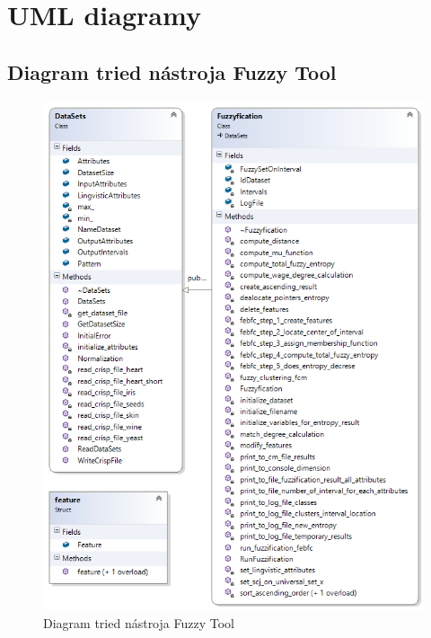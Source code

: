\chapter{UML diagramy}
\section*{Diagram tried nástroja Fuzzy Tool}
\begin{figure}[h]
\includegraphics[width=1\textwidth]{obrazky/ClassDiagram2.png}
\centering
\caption{Diagram tried nástroja Fuzzy Tool} 
\label{fig:diagramTried}
\end{figure}